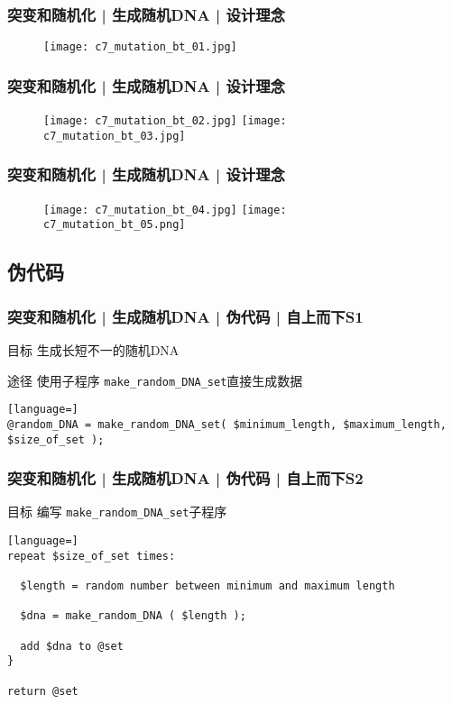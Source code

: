 \begin{frame}
  \frametitle{突变和随机化 | 生成随机DNA | 设计理念}
  \begin{figure}
    \centering
    \texttt{[image: c7\_mutation\_bt\_01.jpg]}
  \end{figure}
\end{frame}

\begin{frame}
  \frametitle{突变和随机化 | 生成随机DNA | 设计理念}
  \begin{figure}
    \centering
    \texttt{[image: c7\_mutation\_bt\_02.jpg]}
    \texttt{[image: c7\_mutation\_bt\_03.jpg]}
  \end{figure}
\end{frame}

\begin{frame}
  \frametitle{突变和随机化 | 生成随机DNA | 设计理念}
  \begin{figure}
    \centering
    \texttt{[image: c7\_mutation\_bt\_04.jpg]}
    \texttt{[image: c7\_mutation\_bt\_05.png]}
  \end{figure}
\end{frame}

\subsection{伪代码}
\begin{frame}[fragile]
  \frametitle{突变和随机化 | 生成随机DNA | 伪代码 | 自上而下S1}
  \begin{block}{目标}
    生成长短不一的随机DNA
  \end{block}
  \pause
  \begin{block}{途径}
  使用子程序 \verb|make_random_DNA_set|直接生成数据
  \end{block}
  \pause
  \vspace{-1.5em}
\begin{lstlisting}[language=]
@random_DNA = make_random_DNA_set( $minimum_length, $maximum_length, $size_of_set );
\end{lstlisting}
\end{frame}

\begin{frame}[fragile]
  \frametitle{突变和随机化 | 生成随机DNA | 伪代码 | 自上而下S2}
  \begin{block}{目标}
    编写 \verb|make_random_DNA_set|子程序
  \end{block}
  \pause
  \vspace{-1.5em}
\begin{lstlisting}[language=]
repeat $size_of_set times:

  $length = random number between minimum and maximum length

  $dna = make_random_DNA ( $length );

  add $dna to @set
}

return @set
\end{lstlisting}
\end{frame}


